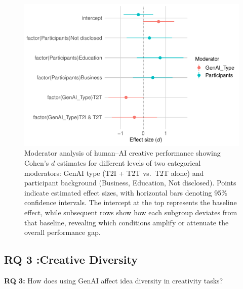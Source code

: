 \documentclass[acmsmall,authorversion]{acmart}
\begin{document}
\begin{figure}[H]
  \centering
  \includegraphics[width=\linewidth]{plot_performance_mod_plot}
  \caption{Moderator analysis of human–AI creative performance showing Cohen’s $d$ estimates for different levels of two categorical moderators: GenAI type (T2I + T2T vs.\ T2T alone) and participant background (Business, Education, Not disclosed). Points indicate estimated effect sizes, with horizontal bars denoting 95\% confidence intervals. The intercept at the top represents the baseline effect, while subsequent rows show how each subgroup deviates from that baseline, revealing which conditions amplify or attenuate the overall performance gap.}
  \label{fig:performance_mod}
\end{figure}
\newpage
\subsection{RQ 3 :Creative Diversity}
\label{sec:CreativeDiversity}

\textbf{RQ 3:} How does using GenAI affect idea diversity in creativity tasks? \\
\end{document}
